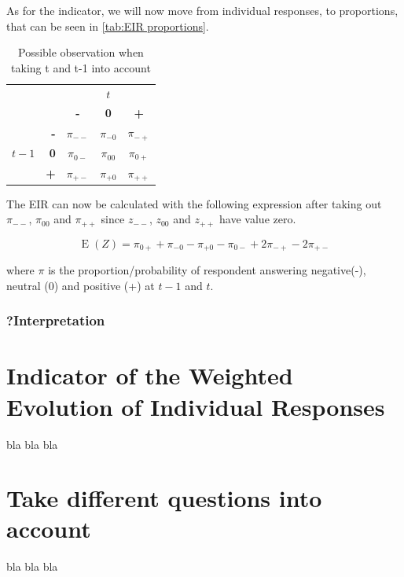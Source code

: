 \documentclass[12pt,a4paper,oneside]{book}
\DeclareMathOperator{\E}{E}
\begin{document}
As for the indicator, we will now move from individual responses, to proportions, that can be seen in \autoref{tab:EIR proportions}.

\begin{table}[H]
    \centering
    \begin{tabular}{r | r | c c c | }
    \multicolumn{1}{r}{} & \multicolumn{1}{r}{} &	\multicolumn{3}{c}{$t$} \\ \cline{3-5}
    \multicolumn{1}{r}{} & 		& \textbf{-} & \textbf{0} & \textbf{+} \\ \cline{2-5}
    		&    \textbf{-} & $\pi_{--}$	& $\pi_{-0}$	& $\pi_{-+}$ \\ 
    $t-1$ & \textbf{0} & $\pi_{0-}$	& $\pi_{00}$	& $\pi_{0+}$	\\
    		&    \textbf{+} & $\pi_{+-}$	& $\pi_{+0}$	& $\pi_{++}$ \\ \cline{2-5}
    \end{tabular}    
    \caption{Possible observation when taking t and t-1 into account}
    \label{tab:EIR proportions}
\end{table}

The EIR can now be calculated with the following expression after taking out $\pi_{--}$, $\pi_{00}$ and $\pi_{++}$ since $z_{--}$, $z_{00}$ and $z_{++}$ have value zero.

\begin{equation}
    \E(Z) = \pi_{0+} + \pi_{-0} - \pi_{+0} - \pi_{0-} +2\pi_{-+} -2\pi_{+-} 
\end{equation}

where $\pi$ is the proportion/probability of respondent answering negative(-), neutral (0) and positive (+) at $t-1$ and $t$. 


\subsubsection{?Interpretation}


\section{Indicator of the Weighted Evolution of Individual Responses}

bla bla bla

\section{Take different questions into account}

bla bla bla
\end{document}
